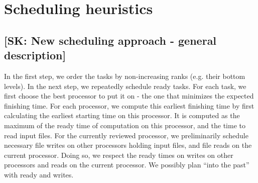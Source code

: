 \documentclass[conference]{IEEEtran}
\newcommand{\skug}[1]{{\color{blue}[SK: #1]}}
\begin{document}
%
%
%



\section{Scheduling heuristics} %
\label{sec:heuristics}
\subsection{\skug{New scheduling approach - general description}}

    In the first step, we order the tasks by non-increasing ranks (e.g. their bottom levels).
    In the next step, we repeatedly schedule ready tasks.
    For each task, we first choose the best processor to put it on - the one that minimizes the expected finishing time.
    For each processor, we compute this earliest finishing time by first calculating the earliest starting time on this processor.
    It is computed as the maximum of the ready time of computation on this processor, and the time to read input files.
    For the currently reviewed processor, we preliminarily schedule necessary file writes on other processors holding input files,
    and file reads on the current processor.
    Doing so, we respect the ready times on writes on other processors and reads on the current processor.
    We possibly plan ``into the past'' with ready and writes.
\end{document}
